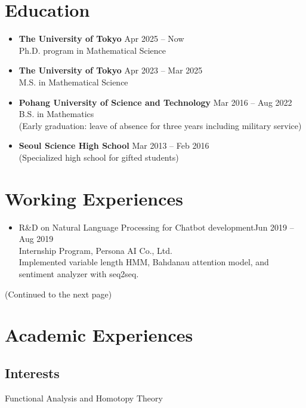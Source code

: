 \documentclass[11pt,a4paper]{article}
\begin{document}
\section*{Education}
\begin{itemize}
\item
	\textbf{The University of Tokyo}
	\hfill{\small Apr 2025 -- Now}\\
	Ph.D. program in Mathematical Science
\item
	\textbf{The University of Tokyo}
	\hfill{\small Apr 2023 -- Mar 2025}\\
	M.S. in Mathematical Science
\item
	\textbf{Pohang University of Science and Technology}
	\hfill{\small Mar 2016 -- Aug 2022}\\
	B.S. in Mathematics\\
	(Early graduation: leave of absence for three years including military service)
\item
	\textbf{Seoul Science High School}
	\hfill{\small Mar 2013 -- Feb 2016}\\
	(Specialized high school for gifted students)
\end{itemize}





\section*{Working Experiences}


\begin{itemize}
\item
	R\&D on Natural Language Processing for Chatbot development\hfill{\small Jun 2019 -- Aug 2019}\\
	Internship Program, Persona AI Co., Ltd.\\[4pt]
	\faArrowRight\quad
	Implemented variable length HMM, Bahdanau attention model, and sentiment analyzer with seq2seq.
\end{itemize}


\vfill\hfill(Continued to the next page)

\clearpage

\section*{Academic Experiences}


\subsection*{Interests}
\hspace{2em}
Functional Analysis and Homotopy Theory
\end{document}
